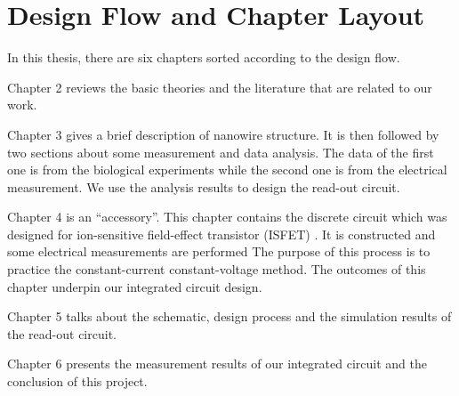 \section{Design Flow and Chapter Layout}
In this thesis, there are six chapters sorted according to the design flow.

Chapter 2 reviews the basic theories and the literature that are related to our work.

Chapter 3 gives a brief description of nanowire structure.
It is then followed by two sections about some measurement and data analysis.
The data of the first one is from the biological experiments while the second one is from the electrical measurement.
We use the analysis results to design the read-out circuit.

Chapter 4 is an ``accessory''.
This chapter contains the discrete circuit which was designed for ion-sensitive field-effect transistor (ISFET) \cite{SF1}.
It is constructed and some electrical measurements are performed
The purpose of this process is to practice the constant-current constant-voltage method.
The outcomes of this chapter underpin our integrated circuit design.

Chapter 5 talks about the schematic, design process and the simulation results of the read-out circuit.

Chapter 6 presents the measurement results of our integrated circuit and the conclusion of this project.








%
%
%
%

